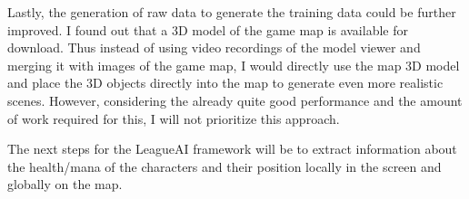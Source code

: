 Lastly, the generation of raw data to generate the training data could be further improved.
I found out that a 3D model of the game map is available for download.
Thus instead of using video recordings of the model viewer and merging it with images of the game map, I would directly use the map 3D model and place the 3D objects directly into the map to generate even more realistic scenes.
However, considering the already quite good performance and the amount of work required for this, I will not prioritize this approach.

The next steps for the LeagueAI framework will be to extract information about the health/mana of the characters and their position locally in the screen and globally on the map.